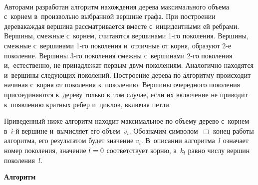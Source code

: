 \begin{multicols}{2}
\setcounter{figure}{1}
\begin{figure*}[b] %
\vspace*{1pt}
      \begin{center}
     \mbox{%
\epsfxsize=83.376mm 
}
\end{center}
\vspace*{-9pt}
\end{figure*}

Авторами разработан алгоритм нахождения дерева максимального объема с~корнем 
в~произвольно выбранной вершине графа. При построении  дерева\linebreak каждая вершина 
рассматривается вместе с~инцидентными ей ребрами. Вершины, смежные с~корнем, 
считаются вершинами 1-го поколения. Вершины, смежные с~вершинами 1-го поколения и~\mbox{отличные} от корня, образуют 2-е поколение. Вершины 3-го поколения смежны 
с~вершинами 2-го поколения и,~естественно, не принадлежат первым двум поколениям. 
Аналогично находятся и~вершины следующих поколений. Построение 
дерева по алгоритму происходит начиная с~корня от поколения к~поколению. Вершины 
очередного поколения присоединяются к~дереву только в~том случае, если их 
включение не приводит к~появлению кратных ребер и~циклов, включая петли.

Приведенный ниже алгоритм находит максимальное по объему дерево с~корнем в~$i$-й 
вершине и~вычисляет его объем~$v_i$. Обозначим символом~$\Box$ конец работы алгоритма, его 
результатом будет значение $v_i$. В~описании алгоритма~$l$ означает номер 
поколения, значение $l\hm=0$ соответствует корню, а~$k_l$ равно числу вершин 
поколения~$l$.

\noindent 
\begin{center}
{\bf Алгоритм}
\end{center}

\vspace*{-6pt}


\end{multicols}
